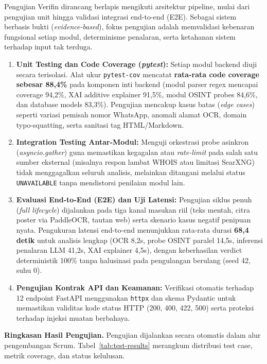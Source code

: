 \documentclass[12pt,a4paper]{article}
\begin{document}
\begin{blokkuning}
Pengujian Verifin dirancang berlapis mengikuti arsitektur pipeline, mulai dari pengujian unit
hingga validasi integrasi end-to-end (E2E). Sebagai sistem berbasis bukti (\textit{evidence-based}),
fokus pengujian adalah memvalidasi kebenaran fungsional setiap modul, determinisme penalaran,
serta ketahanan sistem terhadap input tak terduga.

\begin{enumerate}[label=\textbf{\arabic*.}]
\item \textbf{Unit Testing dan Code Coverage (\textit{pytest}):} Setiap modul backend diuji secara terisolasi.
      Alat ukur \texttt{pytest-cov} mencatat \textbf{rata-rata code coverage sebesar 88,4\%} pada komponen inti backend
      (modul parser regex mencapai coverage 94,2\%, XAI additive explainer 91,5\%, modul OSINT probes 84,6\%,
      dan database models 83,3\%). Pengujian mencakup kasus batas (\textit{edge cases}) seperti variasi pemisah nomor WhatsApp,
      anomali alamat OCR, domain typo-squatting, serta sanitasi tag HTML/Markdown.
\item \textbf{Integration Testing Antar-Modul:} Menguji orkestrasi probe asinkron (\textit{asyncio.gather})
      guna memastikan kegagalan atau \textit{rate-limit} pada salah satu sumber eksternal (misalnya respon lambat WHOIS
      atau limitasi SearXNG) tidak menggagalkan seluruh analisis, melainkan ditangani melalui status \texttt{UNAVAILABLE}
      tanpa mendistorsi penilaian modul lain.
\item \textbf{Evaluasi End-to-End (E2E) dan Uji Latensi:} Pengujian siklus penuh (\textit{full lifecycle})
      dijalankan pada tiga kanal masukan riil (teks mentah, citra poster via PaddleOCR, tautan web) serta skenario kasus negatif
      penipuan nyata. Pengukuran latensi end-to-end menunjukkan rata-rata durasi \textbf{68,4 detik} untuk analisis lengkap
      (OCR 8,2s, probe OSINT paralel 14,5s, inferensi penalaran LLM 41,2s, XAI explainer 4,5s), dengan keberhasilan verdict
      deterministik 100\% tanpa halusinasi pada pengulangan berulang (seed 42, suhu 0).
\item \textbf{Pengujian Kontrak API dan Keamanan:} Verifikasi otomatis terhadap 12 endpoint FastAPI menggunakan
      \texttt{httpx} dan skema Pydantic untuk memastikan validitas kode status HTTP (200, 400, 422, 500) serta proteksi
      terhadap injeksi muatan berbahaya.
\end{enumerate}

\textbf{Ringkasan Hasil Pengujian.} Pengujian dijalankan secara otomatis dalam alur pengembangan Scrum.
Tabel~\ref{tab:test-results} merangkum distribusi test case, metrik coverage, dan status kelulusan.
\end{blokkuning}
\end{document}
